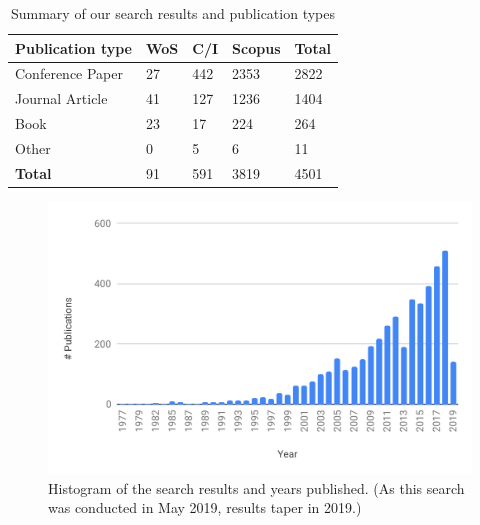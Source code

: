 \begin{table}[tb]
  \caption[Summary of search results in API documentation knowledge]{Summary of our search results and publication types}
  \label{esem2019:tab:search-results}
  \centering
  \begin{tabular}{l|lll|l}
    \toprule
    \textbf{Publication type} &
    \textbf{WoS} &
    \textbf{C/I} &
    \textbf{Scopus} &
    \textbf{Total} \\
    \midrule
    Conference Paper & 27 & 442 & 2353 & 2822 \\
    Journal Article & 41 & 127 & 1236 & 1404\\
    Book & 23 & 17 & 224 & 264\\
    Other & 0 & 5 & 6 & 11\\
    \midrule
    \textbf{Total} & 91 & 591 & 3819 & 4501\\
    \bottomrule
  \end{tabular}
\end{table}

\begin{figure}[hbt]
  \includegraphics[width=\linewidth]{slr-years}
  \caption[SMS search results, by years]{Histogram of the search results and years published. (As this search was conducted in May 2019, results taper in 2019.)}
  \label{esem2019:fig:slr-years}
\end{figure}

